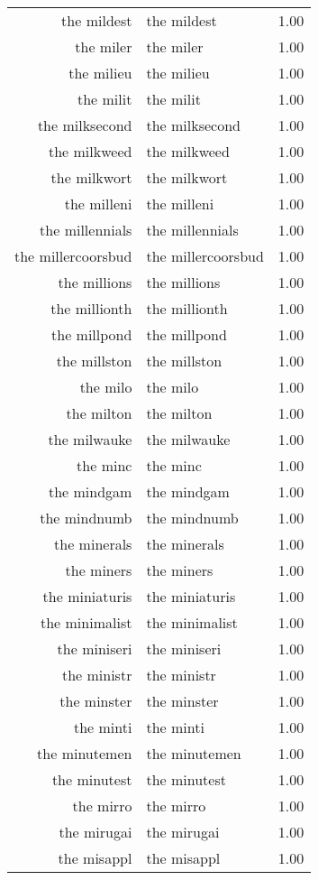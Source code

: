 \begin{table}[ht]
\begin{tabular}{rlr}
  the mildest & the mildest & 1.00 \\ 
  the miler & the miler & 1.00 \\ 
  the milieu & the milieu & 1.00 \\ 
  the milit & the milit & 1.00 \\ 
  the milksecond & the milksecond & 1.00 \\ 
  the milkweed & the milkweed & 1.00 \\ 
  the milkwort & the milkwort & 1.00 \\ 
  the milleni & the milleni & 1.00 \\ 
  the millennials & the millennials & 1.00 \\ 
  the millercoorsbud & the millercoorsbud & 1.00 \\ 
  the millions & the millions & 1.00 \\ 
  the millionth & the millionth & 1.00 \\ 
  the millpond & the millpond & 1.00 \\ 
  the millston & the millston & 1.00 \\ 
  the milo & the milo & 1.00 \\ 
  the milton & the milton & 1.00 \\ 
  the milwauke & the milwauke & 1.00 \\ 
  the minc & the minc & 1.00 \\ 
  the mindgam & the mindgam & 1.00 \\ 
  the mindnumb & the mindnumb & 1.00 \\ 
  the minerals & the minerals & 1.00 \\ 
  the miners & the miners & 1.00 \\ 
  the miniaturis & the miniaturis & 1.00 \\ 
  the minimalist & the minimalist & 1.00 \\ 
  the miniseri & the miniseri & 1.00 \\ 
  the ministr & the ministr & 1.00 \\ 
  the minster & the minster & 1.00 \\ 
  the minti & the minti & 1.00 \\ 
  the minutemen & the minutemen & 1.00 \\ 
  the minutest & the minutest & 1.00 \\ 
  the mirro & the mirro & 1.00 \\ 
  the mirugai & the mirugai & 1.00 \\ 
  the misappl & the misappl & 1.00 \\ 

\end{tabular}
\end{table}
